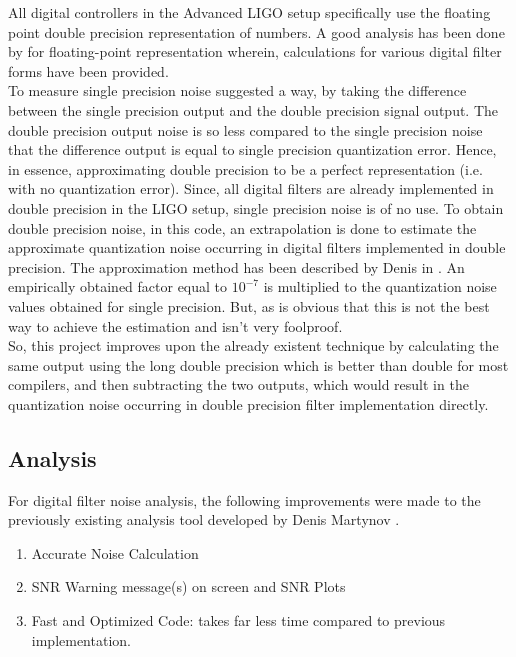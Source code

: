 \documentclass[colorlinks=true,pdfstartview=FitV,linkcolor=blue,
            citecolor=red,urlcolor=magenta]{ligodoc}
\begin{document}
All digital controllers in the Advanced LIGO setup specifically use the floating point double precision representation of numbers. A good analysis has been done by \cite{Matts} for floating-point representation wherein, calculations for various digital filter forms have been provided. \\
	To measure single precision noise \cite{Martynov} suggested a way, by taking the difference between the single precision output and the double precision signal output. The double precision output noise is so less compared to the single precision noise that the difference output is equal to single precision quantization error. Hence, in essence, approximating double precision to be a perfect representation (i.e. with no quantization error). Since, all digital filters are already implemented in double precision in the LIGO setup, single precision noise is of no use. To obtain double precision noise, in this code, an extrapolation is done to estimate the approximate quantization noise occurring in digital filters implemented in double precision. The approximation method has been described by Denis in \cite{Martynov2}. An empirically obtained factor equal to $10^{-7}$ is multiplied to the quantization noise values obtained for single precision. But, as is obvious that this is not the best way to achieve the estimation and isn't very foolproof.\\
 So, this project improves upon the already existent technique by calculating the same output using the long double precision which is better than double for most \cite{longdouble} compilers, and then subtracting the two outputs, which would result in the quantization noise occurring in double precision filter implementation directly. 
		
	\subsection{Analysis}
	For digital filter noise analysis, the following improvements were made to the previously existing analysis tool developed by Denis Martynov \cite{Martynov}.
	\begin{enumerate}
		\item Accurate Noise Calculation
		\item SNR Warning message(s) on screen and SNR Plots
		\item Fast and Optimized Code: takes far less time compared to previous implementation. 
	\end{enumerate}
\end{document}
